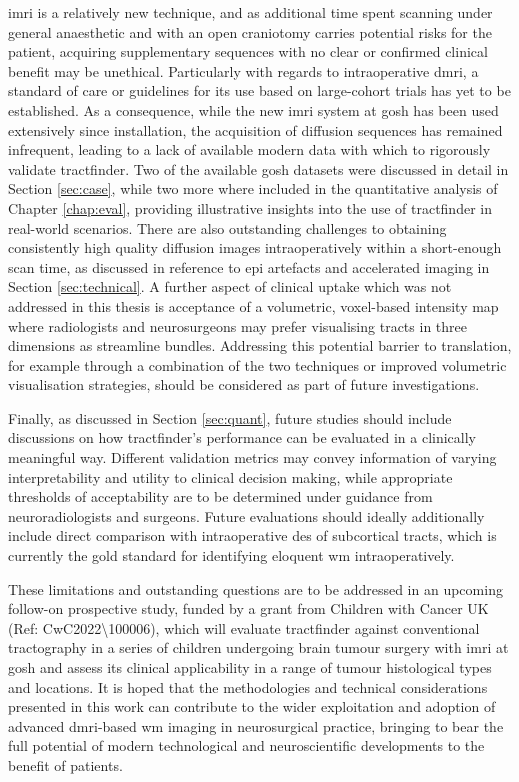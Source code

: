 \Gls{imri} is a relatively new technique, and as additional time spent scanning under general anaesthetic and with an open craniotomy carries potential risks for the patient, acquiring supplementary sequences with no clear or confirmed clinical benefit may be unethical.
Particularly with regards to intraoperative \gls{dmri}, a standard of care or guidelines for its use based on large-cohort trials has yet to be established.
As a consequence, while the new \gls{imri} system at \gls{gosh} has been used extensively since installation, the acquisition of diffusion sequences has remained infrequent, leading to a lack of available modern data with which to rigorously validate tractfinder.
Two of the available \gls{gosh} datasets were discussed in detail in Section \ref{sec:case}, while two more where included in the quantitative analysis of Chapter \ref{chap:eval}, providing illustrative insights into the use of tractfinder in real-world scenarios.
There are also outstanding challenges to obtaining consistently high quality diffusion images intraoperatively within a short-enough scan time, as discussed in reference to \gls{epi} artefacts and accelerated imaging in Section \ref{sec:technical}.
A further aspect of clinical uptake which was not addressed in this thesis is acceptance of a volumetric, voxel-based intensity map where radiologists and neurosurgeons may prefer visualising tracts in three dimensions as streamline bundles.
Addressing this potential barrier to translation, for example through a combination of the two techniques or improved volumetric visualisation strategies, should be considered as part of future investigations.

Finally, as discussed in Section \ref{sec:quant}, future studies should include discussions on how tractfinder's performance can be evaluated in a clinically meaningful way.
Different validation metrics may convey information of varying interpretability and utility to clinical decision making, while appropriate thresholds of acceptability are to be determined under guidance from neuroradiologists and surgeons.
Future evaluations should ideally additionally include direct comparison with intraoperative \gls{des} of subcortical tracts, which is currently the gold standard for identifying eloquent \gls{wm} intraoperatively.

These limitations and outstanding questions are to be addressed in an upcoming follow-on prospective study, funded by a grant from Children with Cancer UK (Ref: CwC2022\textbackslash 100006), which will evaluate tractfinder against conventional tractography in a series of children undergoing brain tumour surgery with \gls{imri} at \gls{gosh} and assess its clinical applicability in a range of tumour histological types and locations.
It is hoped that the methodologies and technical considerations presented in this work can contribute to the wider exploitation and adoption of advanced \gls{dmri}-based \gls{wm} imaging in neurosurgical practice, bringing to bear the full potential of modern technological and neuroscientific developments to the benefit of patients.

